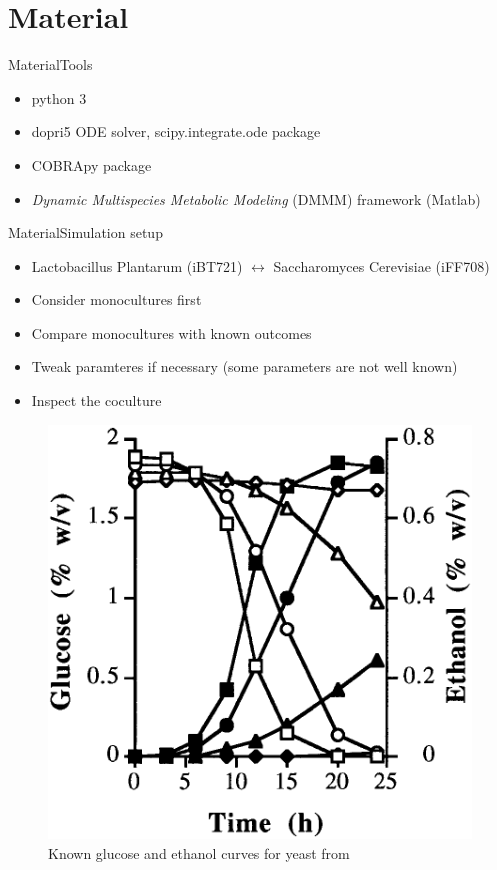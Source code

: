 \documentclass{beamer}
\begin{document}
\section{Material}
\begin{frame}{Material}{Tools}
    \begin{itemize}
      \item python 3
      \item dopri5 ODE solver, scipy.integrate.ode package \cite{hairer1993solving}
      \item COBRApy package \cite{heirendt_creation_nodate}
      \item \textit{Dynamic Multispecies Metabolic Modeling} (DMMM) framework (Matlab)\cite{zhuang_design_2012}
    \end{itemize}
\end{frame}

\begin{frame}{Material}{Simulation setup}
	\begin{minipage}{0.5\linewidth}
	\begin{itemize}
		\item Lactobacillus Plantarum (iBT721) $\leftrightarrow$ Saccharomyces Cerevisiae (iFF708)
		\item Consider monocultures first
		\item Compare monocultures with known outcomes
		\item Tweak paramteres if necessary (some parameters are not well known)
		\item Inspect the coculture
	\end{itemize}
	\end{minipage}
	\hfill
	\begin{minipage}{0.45\linewidth}
		\begin{figure}
			\includegraphics[width=0.8\linewidth]{Img/yeast_real.png}
			\caption{Known glucose and ethanol curves for yeast from \cite{narendranath_effects_1997}}
		\end{figure}
	\end{minipage}
\end{frame}
\end{document}
